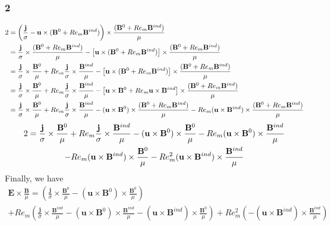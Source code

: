 \documentclass[11pt]{article}
\newcommand{\B}{\mathbf{B}}
\newcommand{\E}{\mathbf{E}}
\newcommand{\JS}{\frac{\mathbf{j}}{\sigma}}
\renewcommand{\U}{\mathbf{u}}
\begin{document}
\subsubsection{2}
\begin{align}
	2 \notag
	& = \left(\JS - \U \times (\B^0 + Re_m \B^{ind}) \right) \times \frac{(\B^0 + Re_m \B^{ind})}{\mu} \notag \\
	& = \JS \times \frac{(\B^0 + Re_m \B^{ind})}{\mu}
	- \left[ \U \times (\B^0 + Re_m \B^{ind}) \right] \times \frac{(\B^0 + Re_m \B^{ind})}{\mu}	\notag \\
	& = \JS \times \frac{\B^0}{\mu} + Re_m \JS \times \frac{\B^{ind}}{\mu}
	- \left[ \U \times (\B^0 + Re_m \B^{ind}) \right] \times \frac{(\B^0 + Re_m \B^{ind})}{\mu}	\notag \\
	& = \JS \times \frac{\B^0}{\mu} + Re_m \JS \times \frac{\B^{ind}}{\mu}
	- \left[ \U \times \B^0 + Re_m \U \times \B^{ind} \right] \times \frac{(\B^0 + Re_m \B^{ind})}{\mu}	\notag \\
	& = \JS \times \frac{\B^0}{\mu} + Re_m \JS \times \frac{\B^{ind}}{\mu}
	- (\U \times \B^0) \times \frac{(\B^0 + Re_m \B^{ind})}{\mu}
	- Re_m (\U \times \B^{ind}) \times \frac{(\B^0 + Re_m \B^{ind})}{\mu} \notag \\
\end{align}
\begin{multline}
	2 = \JS \times \frac{\B^0}{\mu} + Re_m \JS \times \frac{\B^{ind}}{\mu}
	- (\U \times \B^0) \times \frac{\B^0}{\mu}
	- Re_m (\U \times \B^0) \times \frac{\B^{ind}}{\mu} \\
	- Re_m (\U \times \B^{ind}) \times \frac{\B^0}{\mu}
	- Re_m^2 (\U \times \B^{ind}) \times \frac{\B^{ind}}{\mu} \notag \\
\end{multline}
Finally, we have
\begin{multline}
	\E \times \frac{\B}{\mu} =
	\left( \JS \times \frac{\B^0}{\mu}
	- (\U \times \B^0) \times \frac{\B^0}{\mu}
	\right) \\
	+ Re_m
	\left(
	\JS \times \frac{\B^{ind}}{\mu}
	- (\U \times \B^0) \times \frac{\B^{ind}}{\mu}
	- (\U \times \B^{ind}) \times \frac{\B^0}{\mu}
	\right)
	+Re_m^2 \left(
	- (\U \times \B^{ind}) \times \frac{\B^{ind}}{\mu}
	\right)
\end{multline}
\end{document}
